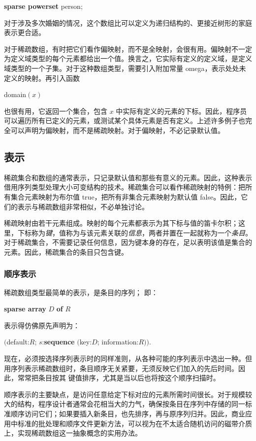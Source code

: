 \tabto*{9.2em}\textbf{sparse powerset} person;

\noindent
对于涉及多次婚姻的情况，这个数组比可以定义为递归结构的、更接近树形的家庭表示更合适。

对于稀疏数组，有时把它们看作偏映射，而不是全映射，会很有用。偏映射不一定为定义域类型的每个元素都给出一个值。换言之，它实际有定义的定义域，是定义域类型的一个子集。对于这种数组类型，需要引入附加常量 omega，表示处处未定义的映射。再引入函数

\quad domain$(x)$

\noindent
也很有用，它返回一个集合，包含 $x$ 中实际有定义的元素的下标。因此，程序员可以遍历所有已定义的元素，或测试某个具体元素是否有定义。上述许多例子也完全可以声明为偏映射，而不是稀疏映射。对于偏映射，不必记录默认值。

\subsection{表示}

\noindent
稀疏集合和数组的通常表示，只记录默认值和那些有意义的元素。因此，这种表示借用序列类型处理大小可变结构的技术。稀疏集合可以看作稀疏映射的特例：把所有集合元素映射为布尔值 true，把所有非集合元素映射为默认值 false。因此，它们的表示与稀疏数组非常相似，不必单独讨论。

稀疏映射由若干元素组成。映射的每个元素都表示为其下标与值的笛卡尔积；这里，下标称为\textit{键}，值称为与该元素关联的\textit{信息}，两者并置在一起就称为一个\textit{条目}。对于稀疏集合，不需要记录任何信息，因为键本身的存在，足以表明该值是集合的元素。因此，稀疏集合的条目只包含键。

\subsubsection{顺序表示}

稀疏数组类型最简单的表示，是条目的序列；
即：

\quad \textbf{sparse array} $D$ \textbf{of} $R$

\noindent
表示得仿佛原先声明为：

\quad $($default:$R$; $s$:\textbf{sequence} $($key:$D$; information:$R))$.

现在，必须按选择序列表示时的同样准则，从各种可能的序列表示中选出一种。但用序列表示稀疏数组时，条目顺序无关紧要，无须反映它们加入的先后时间。因此，常常把条目按其
键值排序，尤其是当以后也将按这个顺序扫描时。

顺序表示的主要缺点，是访问任意给定下标对应的元素所需时间很长。对于规模较大的结构，程序设计者通常会花相当大的力气，确保按条目在序列中存储的同一标准顺序访问它们；如果要插入新条目，也先排序，再与原序列归并。因此，商业应用中标准的批处理和顺序文件更新方法，可以视为在不太适合随机访问的磁带介质上，实现稀疏数组这一抽象概念的实用办法。

